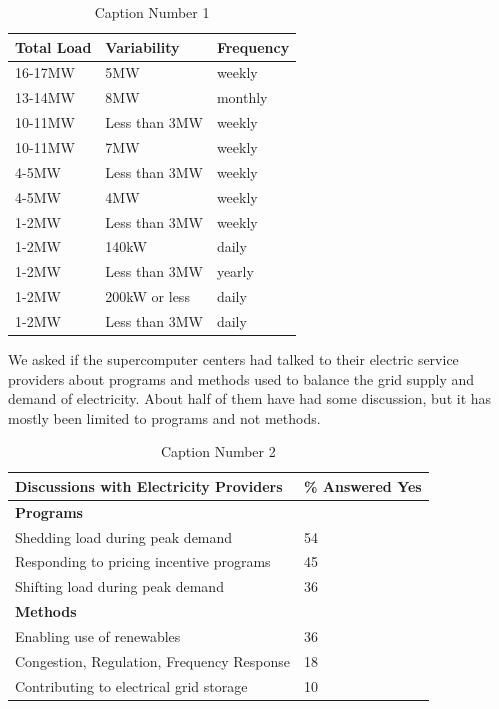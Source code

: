 \documentclass{llncs}
\begin{document}
\begin{table}[htbp]

\begin{center}
\caption{Caption Number 1}
\begin{tabular}{|p{65pt}|l|l|}
\hline
\textbf{Total Load}&
\textbf{Variability}&
\textbf{Frequency} \\
\hline
16-17MW&
5MW&
weekly \\
\hline
13-14MW&
8MW&
monthly \\
\hline
10-11MW&
Less than 3MW&
weekly \\
\hline
10-11MW&
7MW&
weekly \\
\hline
4-5MW&
Less than 3MW&
weekly \\
\hline
4-5MW&
4MW&
weekly \\
\hline
1-2MW&
Less than 3MW&
weekly \\
\hline
1-2MW&
140kW&
daily \\
\hline
1-2MW&
Less than 3MW&
yearly \\
\hline
1-2MW&
200kW or less&
daily \\
\hline
1-2MW&
Less than 3MW&
daily \\
\hline
\end{tabular}
\label{tab1}
\end{center}
\end{table}

We asked if the supercomputer centers had talked to their electric service
providers about programs and methods used to balance the grid supply and
demand of electricity. About half of them have had some discussion, but it
has mostly been limited to programs and not methods.

\begin{table}[htbp]

\begin{center}
\caption{Caption Number 2}
\begin{tabular}{|p{230pt}|l|}
\hline
\textbf{Discussions with Electricity Providers}&
{\%} Answered Yes \\
\hline
\textbf{Programs}&
~ \\
\hline
Shedding load during peak demand&
54 \\
\hline
Responding to pricing incentive programs&
45 \\
\hline
Shifting load during peak demand&
36 \\
\hline
\textbf{Methods}&
~ \\
\hline
Enabling use of renewables&
36 \\
\hline
Congestion, Regulation, Frequency Response&
18 \\
\hline
Contributing to electrical grid storage&
10 \\
\hline
\end{tabular}
\label{tab2}
\end{center}
\end{table}
\end{document}
